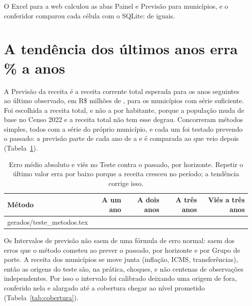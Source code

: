 \documentclass[11pt,a4paper]{article}
\makeatletter
\newenvironment{tabelaplena}
  {\begin{lrbox}{\tabelacaixa}}
  {\end{lrbox}\makebox[\linewidth][c]{\usebox{\tabelacaixa}}}
\newcommand{\linhasde}[1]{\@@input #1 }
\makeatother
\begin{document}
\begin{destaque}
  O Excel para a web calculou as abas Painel e Previsão para
  \NumMunicipiosExcel{} municípios, e o conferidor comparou cada célula
  com o SQLite:
  \NumCelulasExcelBatem{} de \NumCelulasExcel{} iguais.
\end{destaque}

\section{A tendência dos \NumJanelaEscolhido{} últimos anos erra \NumErroEscolhidoTres\% a \NumHorizontes{} anos}
\label{sec:previsao}

A Previsão da receita é a receita corrente total esperada para os
\NumHorizontes{} anos seguintes ao último observado, em R\$ milhões de
\NumAnoBase, para os \NumMunicipiosComPrevisao{} municípios com
série suficiente. Foi escolhida a receita total, e não a por habitante,
porque a população muda de base no Censo 2022 e a receita total não tem
esse degrau. Concorreram \NumMetodos{} métodos simples, todos com a série
do próprio município, e cada um foi testado prevendo o passado: a previsão
parte de cada ano de \NumOrigemInicial{} a \NumOrigemFinal{} e é comparada
ao que veio depois (Tabela~\ref{tab:metodos}).

\begin{table}[H]
  \centering
  \caption{Erro médio absoluto e viés no Teste contra o passado, por
    horizonte. Repetir o último valor erra por baixo porque a receita
    cresceu no período; a tendência corrige isso.}
  \label{tab:metodos}
  \small
  \begin{tabelaplena}
  \begin{tabular}{@{}lrrrr@{}}
    \toprule
    Método & A um ano & A dois anos & A três anos & Viés a três anos \\
    \midrule
    \linhasde{gerados/teste_metodos.tex}
    \bottomrule
  \end{tabular}
  \end{tabelaplena}
\end{table}

Os Intervalos de previsão não saem de uma fórmula de erro normal: saem dos
erros que o método cometeu ao prever o passado, por horizonte e por Grupo
de porte. A receita dos municípios se move junta (inflação, ICMS,
transferências), então as \NumOrigensTeste{} origens do teste são, na
prática, \NumOrigensTeste{} choques, e não centenas de observações
independentes. Por isso o intervalo foi calibrado deixando uma origem de
fora, conferido nela e alargado até a cobertura chegar ao nível prometido
(Tabela~\ref{tab:cobertura}).
\end{document}
